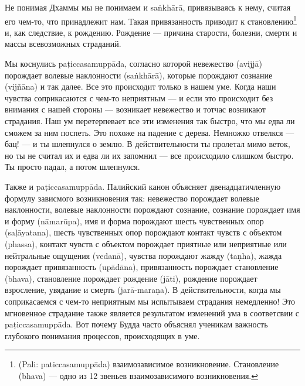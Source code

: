 Не понимая Дхаммы мы не понимаем и sa\.nkh\={a}r\={a}, привязываясь к нему, считая его чем-то, что принадлежит нам. Такая привязанность приводит к становлению\footnote{(Pali: paticcasamupp\={a}da) взаимозависимое возникновение. Становление (bhava) — одно из 12 звеньев взаимозависимого возникновения.} и, как следствие, к рождению. Рождение — причина старости, болезни, смерти и массы всевозможных страданий.

Мы коснулись pa\d{t}iccasamupp\={a}da, согласно которой невежество (avijj\={a}) порождает волевые наклонности (sa\.nkh\={a}r\={a}), которые порождают сознание (vij\~{n}\={a}na) и так далее. Все это происходит только в нашем уме. Когда наши чувства соприкасаются с чем-то неприятным — и если это происходит без внимания с нашей стороны — возникает невежество и тотчас возникают страдания. Наш ум перетерпевает все эти изменения так быстро, что мы едва ли сможем за ним поспеть. Это похоже на падение с дерева. Немножко отвелкся — бац! — и ты шлепнулся о землю. В действительности ты пролетал мимо веток, но ты не считал их и едва ли их запомнил — все происходило слишком быстро. Ты просто падал, а потом шлепнулся.

Также и  pa\d{t}iccasamupp\={a}da. Палийский канон объясняет двенадцатичленную формулу зависмого возникновения так: невежество порождает волевые наклонности, волевые наклонности порождают сознание, сознание порождает имя и форму (n\={a}mar\={u}pa), имя и форма порождают шесть чувственных опор (sa\d{l}\={a}yatana), шесть чувственных опор порождают контакт чувств с объектом (phassa), контакт чувств с объектом порождает приятные или неприятные или нейтральные ощущения (vedan\={a}), чувства порождают жажду (ta\d{n}ha), жажда порождает привязанность (up\={a}d\={a}na), привязанность порождает становление (bhava), становление порождает рождение (j\={a}ti), рождение порождает взросление, увядание и смерть (jar\={a}-mara\d{n}a). В действительности, когда мы соприкасаемся с чем-то неприятным мы испытываем страдания немедленно! Это мгновенное страдание также является результатом изменений ума в соответсвии с  pa\d{t}iccasamupp\={a}da. Вот почему Будда часто объяснял ученикам важность глубокого понимания процессов, происходящих в уме.

